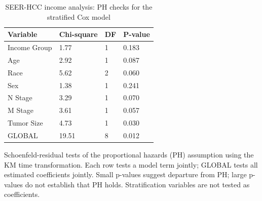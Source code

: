 \begin{table}[!htbp]
\centering
\small
\caption{SEER-HCC income analysis: PH checks for the stratified Cox model}
\begin{tabular}{llll}
\toprule
Variable & Chi-square & DF & P-value \\
\midrule
Income Group & 1.77 & 1 & 0.183 \\
Age & 2.92 & 1 & 0.087 \\
Race & 5.62 & 2 & 0.060 \\
Sex & 1.38 & 1 & 0.241 \\
N Stage & 3.29 & 1 & 0.070 \\
M Stage & 3.61 & 1 & 0.057 \\
Tumor Size & 4.73 & 1 & 0.030 \\
GLOBAL & 19.51 & 8 & 0.012 \\
\bottomrule
\end{tabular}
\begin{minipage}{0.95\linewidth}
\vspace{0.5em}
\footnotesize Schoenfeld-residual tests of the proportional hazards (PH) assumption using the KM time transformation. Each row tests a model term jointly; GLOBAL tests all estimated coefficients jointly. Small p-values suggest departure from PH; large p-values do not establish that PH holds. Stratification variables are not tested as coefficients.
\end{minipage}
\end{table}
